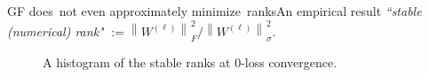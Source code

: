 \documentclass[handout,usenames,dvipsnames]{beamer} %
\newcommand{\norm}[2][]{{\left\|{#2}\right\|_{#1}}}
\begin{document}
\begin{frame}{GF does~not even approximately minimize~ranks}{An empirical result}
    \emph{``stable (numerical) rank"} $:= {\norm{W^{(\ell)}}^2_F} / {\norm{W^{(\ell)}}^2_\sigma}$.
    \begin{figure}[t]
        \centering
        \caption{A histogram of the stable ranks at $0$-loss convergence.}
    \label{fig:empirical-high-f2s}
    \end{figure}
    

\end{frame}
\end{document}
